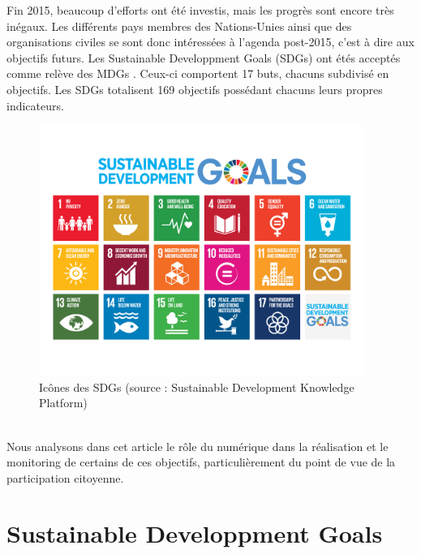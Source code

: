 \documentclass[10pt, conference, compsocconf]{llncs}
\begin{document}
	Fin 2015, beaucoup d'efforts ont été investis, mais les progrès sont encore très inégaux. Les différents pays membres des Nations-Unies ainsi que des organisations civiles se sont donc intéressées à l'agenda post-2015, c'est à dire aux objectifs futurs. Les Sustainable Developpment Goals (SDGs) ont étés acceptés comme relève des MDGs \cite{wikipedia_sustainable_2017}. Ceux-ci comportent 17 buts, chacuns subdivisé en objectifs. Les SDGs totalisent 169 objectifs possédant chacuns leurs propres indicateurs.
	\begin{figure}
		\begin{center}
			\includegraphics[width=300pt]{sdgs.png}
		\end{center}
		\caption{Icônes des SDGs (source : Sustainable Development Knowledge Platform)}
	\end{figure}
	\\
	Nous analysons dans cet article le rôle du numérique dans la réalisation et le monitoring de certains de ces objectifs, particulièrement du point de vue de la participation citoyenne.

	\section{Sustainable Developpment Goals}
\end{document}
